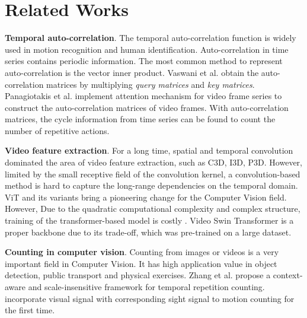 \documentclass[10pt,twocolumn,letterpaper]{article}
\begin{document}
\section{Related Works}
\label{sec:related}

\noindent \textbf{Temporal auto-correlation}. The temporal auto-correlation function is widely used in motion recognition\cite{kobayashi2009three,kobayashi2012motion,chen2017action} and human identification\cite{kobayashi2006three}. Auto-correlation in time series contains periodic information\cite{Auto-correlation1,Auto-correlation2}. The most common method to represent auto-correlation is the vector inner product. Vaswani et al.\cite{vaswani2017attention} obtain the auto-correlation matrices by multiplying \textit{query matrices} and \textit{key matrices}. Panagiotakis et al.\cite{Auto-correlation1} implement attention mechanism for video frame series to construct the auto-correlation matrices of video frames. With auto-correlation matrices, the cycle information from time series can be found to count the number of repetitive actions.

\noindent \textbf{Video feature extraction}.
For a long time, spatial and temporal convolution dominated the area of video feature extraction, such as C3D\cite{C3D}, I3D\cite{I3D}, P3D\cite{P3D}. However, limited by the small receptive field of the convolution kernel, a convolution-based method is hard to capture the long-range dependencies on the temporal domain. ViT\cite{ViT} and its variants bring a pioneering change for the Computer Vision field. However, Due to the quadratic  computational complexity and complex structure, training of the transformer-based model is costly \cite{kitaev2020reformer}. 
Video Swin Transformer\cite{video-swin-transformer} is a proper backbone due to its trade-off, which was pre-trained on a large dataset.

\noindent \textbf{Counting in computer vision}.
Counting from images or videos \cite{synthesized,Runia_2018_CVPR,Arteta16,lu2018class,lian2019density,Zhang_2020_CVPR,DBLP:journals/corr/abs-2103-13096,lian2021locating} is a very important field in Computer Vision. It has high application value in object detection\cite{seenouvong2016computer}, public transport\cite{lengvenis2013application} and physical exercises\cite{soro2019recognition}. Zhang et al.\cite{Zhang_2020_CVPR} propose a context-aware and scale-insensitive framework for temporal repetition counting. \cite{DBLP:journals/corr/abs-2103-13096} incorporate visual signal with corresponding sight signal to motion counting for the first time. 
\end{document}

